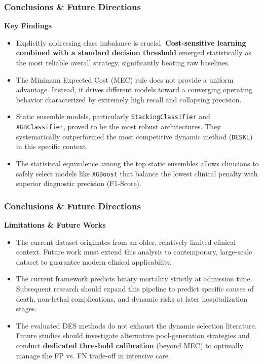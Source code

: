 \documentclass[aspectratio=169,xcolor=dvipsnames]{beamer}
\begin{document}
\begin{frame}
\frametitle{Conclusions \& Future Directions}

	\textbf{Key Findings}
\begin{itemize}
            \setlength{\itemsep}{0.5em}
            \item Explicitly addressing class imbalance is crucial. \textbf{Cost-sensitive learning combined with a standard decision threshold} emerged statistically as the most reliable overall strategy, significantly beating raw baselines.
            
            \item The Minimum Expected Cost (MEC) rule does not provide a uniform advantage. Instead, it drives different models toward a converging operating behavior characterized by extremely high recall and collapsing precision.
            
            \item Static ensemble models, particularly \texttt{StackingClassifier} and \texttt{XGBClassifier}, proved to be the most robust architectures. They systematically outperformed the most competitive dynamic method (\texttt{DESKL}) in this specific context.
            
            \item The statistical equivalence among the top static ensembles allows clinicians to safely select models like \texttt{XGBoost} that balance the lowest clinical penalty with superior diagnostic precision (F1-Score).
        \end{itemize}
\end{frame}


\begin{frame}
\frametitle{Conclusions \& Future Directions}

	\textbf{Limitations \& Future Works}
	\begin{itemize}
	    \setlength{\itemsep}{0.5em}

		\item The current dataset originates from an older, relatively limited clinical context. Future work must extend this analysis to contemporary, large-scale dataset to guarantee modern clinical applicability.
            
            \item The current framework predicts binary mortality strictly at admission time. Subsequent research should expand this pipeline to predict specific causes of death, non-lethal complications, and dynamic risks at later hospitalization stages.
            
            \item The evaluated DES methods do not exhaust the dynamic selection literature. Future studies should investigate alternative pool-generation strategies and conduct \textbf{dedicated threshold calibration} (beyond MEC) to optimally manage the FP vs. FN trade-off in intensive care.
    \end{itemize}

\end{frame}
\end{document}
